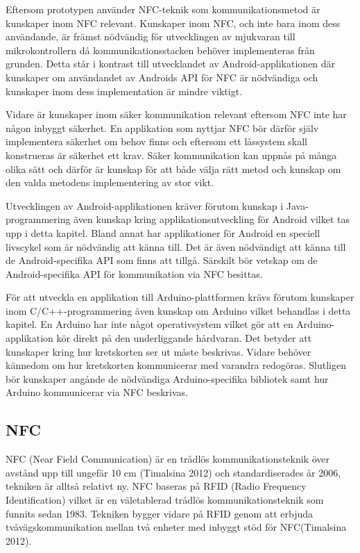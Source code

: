 \documentclass[11pt]{article}
\begin{document}
Eftersom prototypen använder NFC-teknik som kommunikationsmetod är kunskaper inom NFC relevant. Kunskaper inom NFC, och inte bara inom dess användande, är främst nödvändig för utvecklingen av mjukvaran till mikrokontrollern då kommunikationsstacken behöver implementeras från grunden. Detta står i kontrast till utvecklandet av Android-applikationen där kunskaper om användandet av Androids API för NFC är nödvändiga och kunskaper inom dess implementation är mindre viktigt.

Vidare är kunskaper inom säker kommunikation relevant eftersom NFC inte har någon inbyggt säkerhet. En applikation som nyttjar NFC bör därför själv implementera säkerhet om behov finns och eftersom ett låssystem skall konstrueras är säkerhet ett krav. Säker kommunikation kan uppnås på många olika sätt och därför är kunskap för att både välja rätt metod och kunskap om den valda metodens implementering av stor vikt. 

Utvecklingen av Android-applikationen kräver förutom kunskap i Java-programmering även kunskap kring applikationsutveckling för Android vilket tas upp i detta kapitel. Bland annat har applikationer för Android en speciell livscykel som är nödvändig att känna till. Det är även nödvändigt att känna till de Android-specifika API som finns att tillgå. Särskilt bör vetskap om de Android-specifika API för kommunikation via NFC besittas. 

För att utveckla en applikation till Arduino-plattformen krävs förutom kunskaper inom C/C++-programmering även kunskap om Arduino vilket behandlas i detta kapitel. En Arduino har inte något operativsystem vilket gör att en Arduino-applikation kör direkt på den underliggande hårdvaran. Det betyder att kunskaper kring hur kretskorten ser ut måste beskrivas. Vidare behöver kännedom om hur kretskorten kommunicerar med varandra redogöras. Slutligen bör kunskaper angånde de nödvändiga Arduino-specifika bibliotek samt hur Arduino kommunicerar via NFC beskrivas.

\subsection{NFC}
NFC (Near Field Communication) är en trådlös kommunikationsteknik över avstånd upp till ungefär 10 cm (Timalsina 2012) och standardiserades år 2006, tekniken är alltså relativt ny. NFC baseras på RFID (Radio Frequency Identification) vilket är en väletablerad trådlös kommunikationsteknik som funnits sedan 1983.  Tekniken bygger vidare på RFID genom att erbjuda tvåvägskommunikation mellan två enheter med inbyggt stöd för NFC(Timalsina 2012). 
\end{document}
